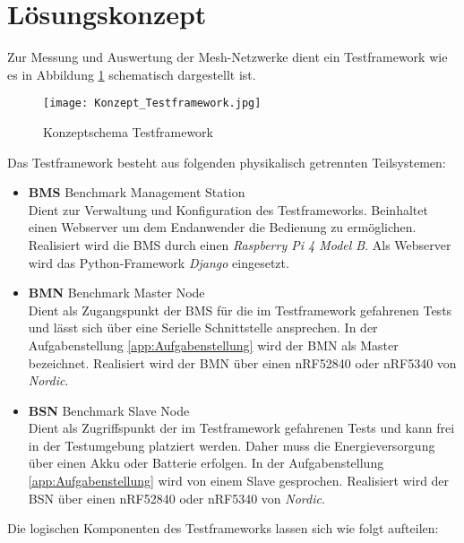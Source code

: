 \clearpage
\section{Lösungskonzept}\label{sec:Loesungskonzept}
Zur Messung und Auswertung der Mesh-Netzwerke dient ein Testframework wie es in Abbildung \ref{fig:KonzeptschemaTestframework} schematisch dargestellt ist.

\begin{figure}[H]
	\centering
	\texttt{[image: Konzept\_Testframework.jpg]}
	\caption{Konzeptschema Testframework}\label{fig:KonzeptschemaTestframework}
\end{figure}


Das Testframework besteht aus folgenden physikalisch getrennten Teilsystemen:

\begin{itemize}
	\item \textbf{BMS} Benchmark Management Station \\ 
	Dient zur Verwaltung und Konfiguration des Testframeworks. Beinhaltet einen Webserver um dem Endanwender die Bedienung zu ermöglichen. Realisiert wird die BMS durch einen \textit{Raspberry Pi 4 Model B}. Als Webserver wird das Python-Framework \textit{Django} eingesetzt. 
	\item \textbf{BMN} Benchmark Master Node \\ 
	Dient als Zugangspunkt der BMS für die im Testframework gefahrenen Tests und lässt sich über eine Serielle Schnittstelle ansprechen. In der Aufgabenstellung \ref{app:Aufgabenstellung} wird der BMN als Master bezeichnet. Realisiert wird der BMN über einen nRF52840 oder nRF5340 von \textit{Nordic}. 
	\item \textbf{BSN} Benchmark Slave Node \\ 
	Dient als Zugriffspunkt der im Testframework gefahrenen Tests und kann frei in der Testumgebung platziert werden. Daher muss die Energieversorgung über einen Akku oder Batterie erfolgen. In der Aufgabenstellung  \ref{app:Aufgabenstellung} wird von einem Slave gesprochen. Realisiert wird der BSN über einen nRF52840 oder nRF5340 von \textit{Nordic}.
\end{itemize}

Die logischen Komponenten des Testframeworks lassen sich wie folgt aufteilen:

